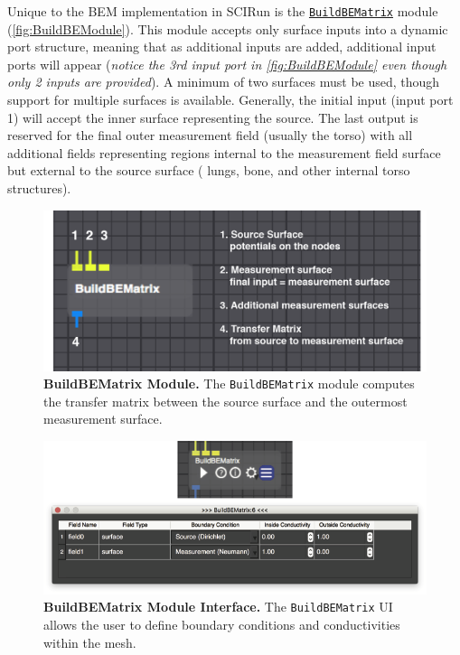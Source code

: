 Unique to the BEM implementation in SCIRun is the \href{http://sciinstitute.github.io/scirun.pages/modules.html#BuildFEMatrix}{\tt BuildBEMatrix} module (\autoref{fig:BuildBEModule}).
This module accepts only surface inputs into a dynamic port structure, meaning that as additional inputs are added, additional input ports will appear ({\em notice the 3rd input port in \autoref{fig:BuildBEModule} even though only 2 inputs are provided}).
A minimum of two surfaces must be used, though support for multiple surfaces is available.
Generally, the initial input (input port 1) will accept the inner surface representing the source.
The last output is reserved for the final outer measurement field (usually the torso) with all additional fields representing regions internal to the measurement field surface but external to the source surface (\eg{} lungs, bone, and other internal torso structures).

\begin{figure}[H]
\begin{center}
\includegraphics[width=.8\textwidth]{ECGToolkitGuide_figures/BEMmod.png}
\caption{{\bf BuildBEMatrix Module.} The {\tt BuildBEMatrix} module computes the transfer matrix between
the source surface and the outermost measurement surface.}
\label{fig:BuildBEModule}
\end{center}
\end{figure}

\newpage

\begin{figure}[t]
\begin{center}
\includegraphics[width=\textwidth]{ECGToolkitGuide_figures/BuildBEUI_combined.png}
\caption{{\bf BuildBEMatrix Module Interface.} The {\tt BuildBEMatrix} UI allows the user to define boundary
conditions and conductivities within the mesh. }
\label{fig:BEM_UI}
\end{center}
\end{figure}

